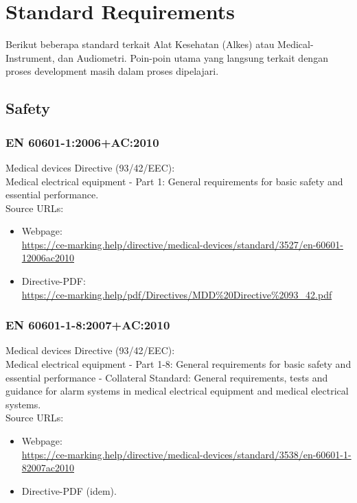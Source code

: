 \documentclass[12pt,]{article}
\begin{document}
	
	\newpage
	\section{Standard Requirements} 
	
	Berikut beberapa standard terkait Alat Kesehatan (Alkes) atau Medical-Instrument, dan Audiometri.
	Poin-poin utama yang langsung terkait dengan proses development masih dalam proses dipelajari.
	
	\subsection{Safety}
	
	\subsubsection{EN 60601-1:2006+AC:2010}
	Medical devices Directive (93/42/EEC):\\
	Medical electrical equipment - Part 1: General requirements for basic safety and essential performance.\\
	
	Source URLs:
	\begin{itemize}
		\item Webpage:\\
		\url{https://ce-marking.help/directive/medical-devices/standard/3527/en-60601-12006ac2010}
		
		\item Directive-PDF:\\
		\url{https://ce-marking.help/pdf/Directives/MDD\%20Directive\%2093_42.pdf}
	\end{itemize}

	\subsubsection{EN 60601-1-8:2007+AC:2010}
	Medical devices Directive (93/42/EEC):\\
	Medical electrical equipment - Part 1-8: General requirements for basic safety and essential performance - 
	Collateral Standard: General requirements, tests and guidance for alarm systems in medical electrical equipment
	and medical electrical systems.\\ 
	
	Source URLs:
	\begin{itemize}
		\item Webpage:\\
		\url{https://ce-marking.help/directive/medical-devices/standard/3538/en-60601-1-82007ac2010}
		
		\item Directive-PDF (idem).
	\end{itemize}
\end{document}
